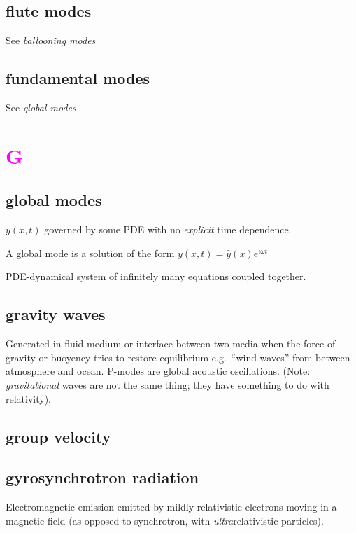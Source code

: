 \documentclass[12pt]{article}
\begin{document}
\subsection*{flute modes}
See \emph{ballooning modes}

\subsection*{fundamental modes}
See \emph{global modes}

\section*{\textcolor{magenta}{G}}

\subsection*{global modes}
\begin{itemize*}
    \item $y(x,t)$ governed by some PDE with no \emph{explicit} time dependence.
    \item A global mode is a solution of the form
        $y(x,t) = \hat{y}(x)e^{i\omega t}$
    \item PDE-dynamical system of infinitely many equations coupled together.
\end{itemize*}

\subsection*{gravity waves}
Generated in fluid medium or interface between two media when the
force of gravity or buoyency tries to restore equilibrium
e.g.\ ``wind waves'' from between atmosphere and ocean.
P-modes are global acoustic oscillations.
(Note: \emph{gravitational} waves are not the same thing; they
have something to do with relativity).

\subsection*{group velocity}

\subsection*{gyrosynchrotron radiation}
Electromagnetic emission emitted by mildly relativistic electrons moving
in a magnetic field
(as opposed to synchrotron, with \emph{ultra}relativistic particles).
\end{document}
